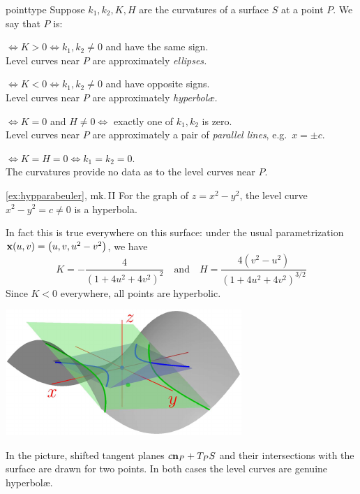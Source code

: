 \begin{defn}{}{pointtype}
	Suppose $k_1,k_2,K,H$ are the curvatures of a surface $S$ at a point $P$. We say that $P$ is:
	\begin{description}\itemsep0pt
		\item[\normalfont\emph{Elliptic}]\negthickspace$\iff K>0\iff k_1,k_2\neq 0$ and have the same sign.\\
	  Level curves near $P$ are approximately \emph{ellipses.}
	  \item[\normalfont\emph{Hyperbolic}]\negthickspace$\iff K<0\iff k_1,k_2\neq 0$ and have opposite signs.\\
	  Level curves near $P$ are approximately \emph{hyperbolæ.}
	  \item[\normalfont\emph{Parabolic}]\negthickspace$\iff K=0$ and $H\neq 0 \iff$ exactly one of $k_1,k_2$ is zero.\\
	  Level curves near $P$ are approximately a pair of \emph{parallel lines}, e.g.\ $x=\pm c$.
	  \item[\normalfont\emph{Planar}]\negthickspace$\iff K=H=0\iff k_1=k_2=0$.\\
	  The curvatures provide no data as to the level curves near $P$.
	\end{description}
\end{defn}


\begin{example*}{\ref{ex:hypparabeuler}, mk.\,II}{}
	For the graph of $z=x^2-y^2$, the level curve $x^2-y^2=c\neq 0$ is a hyperbola.\par
	\begin{minipage}[t]{0.63\linewidth}\vspace{-5pt}
		In fact this is true everywhere on this surface: under the usual parametrization ${\mathbf{x}}(u,v)=\bigl(u,v,u^2-v^2\bigr)$, we have
		\[
			K=-\frac{4}{(1+4u^2+4v^2)^2} \quad \text{and} \quad  H=\frac{4(v^2-u^2)}{(1+4u^2+4v^2)^{3/2}}
		\]
		Since $K<0$ everywhere, all points are hyperbolic.
	\end{minipage}
	\hfill
	\begin{minipage}[t]{0.36\linewidth}\vspace{0pt}
		\flushright\href{http://www.math.uci.edu/~ndonalds/math162a/euler-setup3.html}{\includegraphics{euler-setup3}}
	\end{minipage}\smallbreak
	In the picture, shifted tangent planes $c{\mathbf{n}}_P+T_PS$ and their intersections with the surface are drawn for two points. In both cases the level curves are genuine hyperbolæ.
\end{example*}



